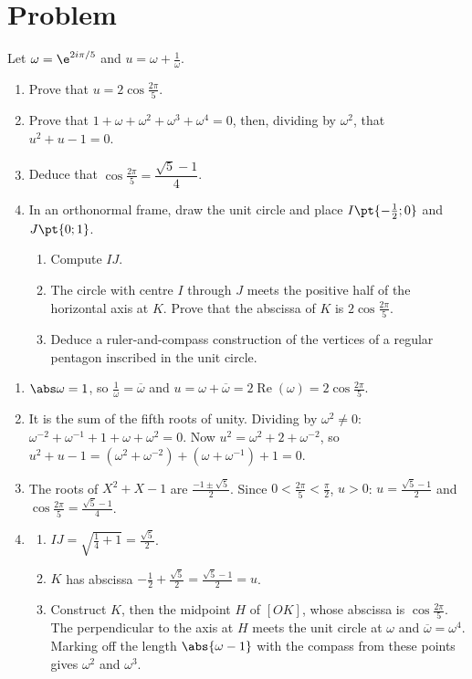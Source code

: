 \mxnewpage
\section{Problem}
\begin{problem}
Let $\omega=\e^{2i\pi/5}$ and $u=\omega+\frac1\omega$.
\begin{enumerate}
\item Prove that $u=2\cos\frac{2\pi}5$.
\item Prove that $1+\omega+\omega^2+\omega^3+\omega^4=0$, then, dividing by $\omega^2$, that $u^2+u-1=0$.
\item Deduce that $\cos\frac{2\pi}5=\dfrac{\sqrt5-1}4$.
\item In an orthonormal frame, draw the unit circle and place $I\pt{-\frac12;0}$ and $J\pt{0;1}$.
\begin{enumerate}
\item Compute $IJ$.
\item The circle with centre $I$ through $J$ meets the positive half of the horizontal axis at $K$. Prove that the abscissa of $K$ is $2\cos\frac{2\pi}5$.
\item Deduce a ruler-and-compass construction of the vertices of a regular pentagon inscribed in the unit circle.
\end{enumerate}
\end{enumerate}
\end{problem}
\begin{solution}[Problem]
\begin{enumerate}
\item $\abs\omega=1$, so $\frac1\omega=\overline\omega$ and $u=\omega+\overline\omega=2\operatorname{Re}(\omega)=2\cos\frac{2\pi}5$.
\item It is the sum of the fifth roots of unity. Dividing by $\omega^2\neq0$: $\omega^{-2}+\omega^{-1}+1+\omega+\omega^2=0$. Now $u^2=\omega^2+2+\omega^{-2}$, so $u^2+u-1=\left(\omega^2+\omega^{-2}\right)+\left(\omega+\omega^{-1}\right)+1=0$.
\item The roots of $X^2+X-1$ are $\frac{-1\pm\sqrt5}2$. Since $0<\frac{2\pi}5<\frac\pi2$, $u>0$: $u=\frac{\sqrt5-1}2$ and $\cos\frac{2\pi}5=\frac{\sqrt5-1}4$.
\item
\begin{enumerate}
\item $IJ=\sqrt{\frac14+1}=\frac{\sqrt5}2$.
\item $K$ has abscissa $-\frac12+\frac{\sqrt5}2=\frac{\sqrt5-1}2=u$.
\item Construct $K$, then the midpoint $H$ of $[OK]$, whose abscissa is $\cos\frac{2\pi}5$. The perpendicular to the axis at $H$ meets the unit circle at $\omega$ and $\overline\omega=\omega^4$. Marking off the length $\abs{\omega-1}$ with the compass from these points gives $\omega^2$ and $\omega^3$.
\end{enumerate}
\end{enumerate}
\end{solution}
